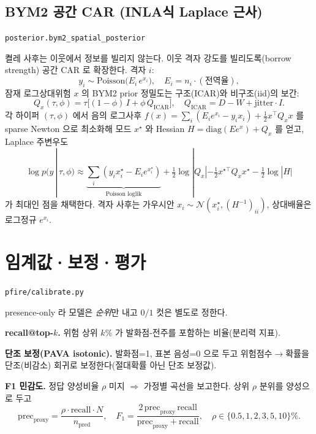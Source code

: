 \documentclass[11pt,a4paper]{article}
\newcommand{\src}[1]{{\footnotesize\color{gray}\texttt{#1}}}
\begin{document}
\subsection{BYM2 공간 CAR (INLA식 Laplace 근사)}
\src{posterior.bym2\_spatial\_posterior}

켤레 사후는 이웃에서 정보를 빌리지 않는다. 이웃 격자 강도를 빌리도록(borrow strength)
공간 CAR 로 확장한다. 격자 $i$:
\begin{equation}
y_i\sim\mathrm{Poisson}\!\big(E_i\,e^{x_i}\big),\quad E_i=n_i\cdot(\text{전역율}),
\end{equation}
잠재 로그상대위험 $x$ 의 BYM2 prior 정밀도는 구조(ICAR)와 비구조(iid)의 보간:
\begin{equation}
Q_x(\tau,\phi)=\tau\big[(1-\phi)\,I+\phi\,Q_{\text{ICAR}}\big],\quad
Q_{\text{ICAR}}=D-W+\text{jitter}\cdot I.
\end{equation}
각 하이퍼 $(\tau,\phi)$ 에서 음의 로그사후 $f(x)=\sum_i(E_i e^{x_i}-y_i x_i)+\tfrac12 x^\top Q_x x$ 를
sparse Newton 으로 최소화해 모드 $x^\star$ 와 Hessian $H=\mathrm{diag}(E e^{x})+Q_x$ 를 얻고,
Laplace 주변우도
\begin{equation}
\log p(y\,|\,\tau,\phi)\approx \underbrace{\textstyle\sum_i(y_i x_i^\star-E_i e^{x_i^\star})}_{\text{Poisson loglik}}
+\tfrac12\log|Q_x|-\tfrac12 x^{\star\top}Q_x x^\star-\tfrac12\log|H|
\end{equation}
가 최대인 점을 채택한다. 격자 사후는 가우시안 $x_i\sim\mathcal N(x_i^\star,(H^{-1})_{ii})$,
상대배율은 로그정규 $e^{x_i}$.

\section{임계값·보정·평가}
\src{pfire/calibrate.py}

presence-only 라 모델은 \emph{순위}만 내고 $0/1$ 컷은 별도로 정한다.

\textbf{recall@top-$k$.} 위험 상위 $k\%$ 가 발화점-전주를 포함하는 비율(분리력 지표).

\textbf{단조 보정(PAVA isotonic).} 발화점=1, 표본 음성=0 으로 두고 위험점수$\to$확률을
단조(비감소) 회귀로 보정한다(절대확률 아닌 단조 보정값).

\textbf{F1 민감도.} 정답 양성비율 $\rho$ 미지 $\Rightarrow$ 가정별 곡선을 보고한다. 상위
$\rho$ 분위를 양성으로 두고
\begin{equation}
\text{prec}_{\text{proxy}}=\frac{\rho\cdot\text{recall}\cdot N}{n_{\text{pred}}},\quad
F_1=\frac{2\,\text{prec}_{\text{proxy}}\,\text{recall}}{\text{prec}_{\text{proxy}}+\text{recall}},
\quad \rho\in\{0.5,1,2,3,5,10\}\%.
\end{equation}
\end{document}
